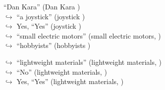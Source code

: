 \documentclass[11pt,a4paper, onecolumn]{article}
\begin{document}
\begin{figure}[t]
\begin{tcolorbox}[boxsep=0pt,left=5pt,right=0pt,top=2pt,colback = yellow!5]
\begin{dialogue}
{ ``Dan Kara'' (Dan Kara ) }
\\
\colorbox{pink!25}{$\hookrightarrow$}
{ ``a joystick'' (joystick ) }
\\
\colorbox{pink!25}{$\hookrightarrow$}
\colorbox{red!25}{Yes,}
{ ``Yes'' (joystick ) }
\\
\colorbox{pink!25}{$\hookrightarrow$}
{ ``small electric motors'' (small electric motors, ) }
\\
\colorbox{pink!25}{$\hookrightarrow$}
{ ``hobbyists'' (hobbyists ) }
 \end{dialogue}\end{tcolorbox}\end{figure}\begin{figure}[t] \small \begin{tcolorbox}[boxsep=0pt,left=5pt,right=0pt,top=2pt,colback = yellow!5] \begin{dialogue}
 \small 
\colorbox{pink!25}{$\hookrightarrow$}
{ ``lightweight materials'' (lightweight materials, ) }
\\
\colorbox{pink!25}{$\hookrightarrow$}
{ ``No'' (lightweight materials, ) }
\\
\colorbox{pink!25}{$\hookrightarrow$}
\colorbox{red!25}{Yes,}
{ ``Yes'' (lightweight materials, ) }
\\
 \end{dialogue}\end{tcolorbox}\end{figure}
\end{document}

